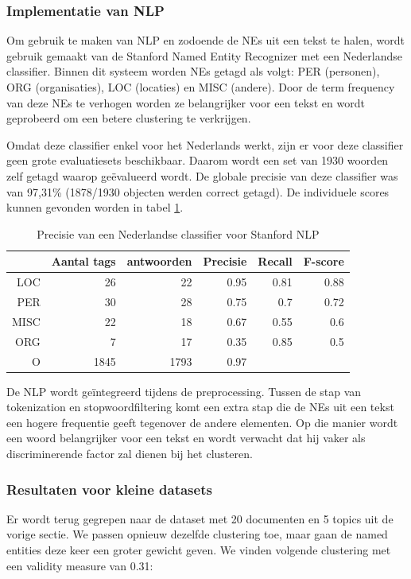 \subsubsection{Implementatie van NLP}
Om gebruik te maken van NLP en zodoende de NEs uit een tekst te halen, wordt gebruik gemaakt van de Stanford Named Entity Recognizer \cite{Finkel2005} met een Nederlandse classifier. Binnen dit systeem worden NEs getagd als volgt: PER (personen), ORG (organisaties), LOC (locaties) en MISC (andere). Door de term frequency van deze NEs te verhogen worden ze belangrijker voor een tekst en wordt geprobeerd om een betere clustering te verkrijgen. 

Omdat deze classifier enkel voor het Nederlands werkt, zijn er voor deze classifier geen grote evaluatiesets beschikbaar. Daarom wordt een set van 1930 woorden zelf getagd waarop ge\"evalueerd wordt. De globale precisie van deze classifier was van 97,31\% (1878/1930 objecten werden correct getagd). De individuele scores kunnen gevonden worden in tabel \ref{tab:nlp-classifier}. 

\begin{table}[htbp]
  \caption{Precisie van een Nederlandse classifier voor Stanford NLP}
  \centering
    \begin{tabular}{rrrrrr}
    \toprule
          & Aantal tags & antwoorden & Precisie & Recall & F-score \\
    \midrule
    LOC   & 26    & 22    & 0.95  & 0.81  & 0.88 \\
    PER   & 30    & 28    & 0.75  & 0.7   & 0.72 \\
    MISC  & 22    & 18    & 0.67  & 0.55  & 0.6 \\
    ORG   & 7     & 17    & 0.35  & 0.85  & 0.5 \\
    O     & 1845  & 1793  & 0.97  &       &  \\
    \bottomrule
    \end{tabular}%
  \label{tab:nlp-classifier}%
\end{table}%

De NLP wordt ge\"integreerd tijdens de preprocessing. Tussen de stap van tokenization en stopwoordfiltering komt een extra stap die de NEs uit een tekst een hogere frequentie geeft tegenover de andere elementen. Op die manier wordt een woord belangrijker voor een tekst en wordt verwacht dat hij vaker als discriminerende factor zal dienen bij het clusteren. 

\subsubsection{Resultaten voor kleine datasets}
Er wordt terug gegrepen naar de dataset met 20 documenten en 5 topics uit de vorige sectie. We passen opnieuw dezelfde clustering toe, maar gaan de named entities deze keer een groter gewicht geven. We vinden volgende clustering met een validity measure van 0.31:
\\

